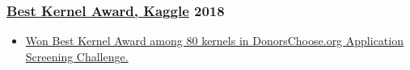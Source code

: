 \documentclass{ExpressiveResume}
\newcommand{\mainBullet}{\hspace{12pt}\color{blue}\fontsize{11}{13.2}\selectfont{\ding{70}}}
\begin{document}
\subsubsection*{\href{https://www.kaggle.com/c/donorschoose-application-screening/discussion/55396}{{\mainBullet} Best Kernel Award, Kaggle} \hfill 2018}
\begin{itemize}[leftmargin=*, label={}]
    \item \href{https://www.kaggle.com/c/donorschoose-application-screening/discussion/55396}{Won Best Kernel Award among 80 kernels in DonorsChoose.org Application Screening Challenge.}
\end{itemize}

\end{document}
